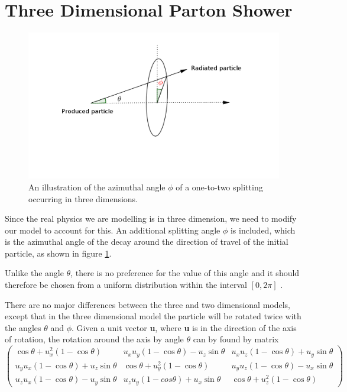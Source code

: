 \section{Three Dimensional Parton Shower}

\begin{figure}[hbtp]
\centering
\includegraphics[scale=.3]{images/three-dimentions.png}
\caption{An illustration of the azimuthal angle $\phi$ of a one-to-two splitting occurring in three dimensions.}\label{fig:3d}
\end{figure}
Since the real physics we are modelling is in three dimension, we need to modify our model to account for this. An additional splitting angle $\phi$ is included, which is the azimuthal angle of the decay  around the direction of travel of the initial particle, as shown in figure \ref{fig:3d}.

Unlike the angle $\theta$, there is no preference for the value of this angle and it should therefore be chosen from a uniform distribution within the interval $[0,2\pi]$ \citep{Salam:2010zt}.

There are no major differences between the three and two dimensional models, except that in the three dimensional model the particle will be rotated twice with the angles $\theta$ and $\phi$. Given a unit vector \textbf{u}, where \textbf{u} is
in the direction of the axis of rotation,  the rotation around the axis by angle $\theta$ can by found by matrix       
\begin{equation} 
\begin{pmatrix}
\cos\theta + u^2_x(1-\cos\theta) & u_x u_y (1-\cos\theta) - u_z \sin\theta& u_x u_z(1-\cos\theta)+ u_y \sin\theta\\

u_y u_x (1 - \cos\theta) + u_z \sin\theta & \cos\theta + u_y^2 (1 - \cos\theta) & u_y u_z (1 - \cos\theta) - u_x \sin\theta \\

u_z u_x (1 - \cos\theta) - u_y \sin\theta & u_z u_y (1 - cos\theta) + u_x \sin\theta & \cos\theta + u_z^2 (1 - \cos\theta)
\end{pmatrix}
\end{equation}

